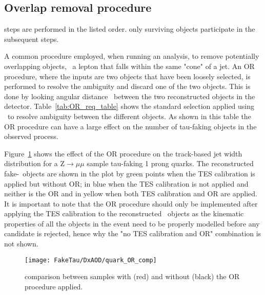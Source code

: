 	\subsection*{Overlap removal procedure}
	\label{sec:ORprocedure}
	\begin{table}[!hbt]
	\caption{steps are performed in the listed order. only surviving objects participate in the subsequent steps.}
	\begin{center}
	
	\end{center}
	\label{tab:OR_req_table}
	\end{table}
	A common procedure employed, when running an analysis, to remove potentially overlapping objects, \ie\ a lepton that falls within the same "cone" of a jet. An \ac{OR} procedure, where the inputs are two objects that have been loosely selected, is performed to resolve the ambiguity and discard one of the two objects. This is done by looking angular distance \dr\ between the two reconstructed objects in the detector.
	Table~\ref{tab:OR_req_table} shows the standard selection applied using \dr\ to resolve ambiguity between the different objects. 
	As shown in this table the \ac{OR} procedure can have a large effect on the number of tau-faking objects in the observed process.
	
	 Figure~\ref{fig:ORvsnoOR} shows the effect of the \ac{OR} procedure  on the track-based jet width distribution for a Z$\rightarrow\mu\mu$ sample tau-faking 1 prong quarks.
	 The reconstructed fake-\htau\ objects are shown in the plot by green points when the \ac{TES} calibration is applied but without \ac{OR}; in blue when the \ac{TES} calibration is not applied and neither is the \ac{OR} and in yellow when both \ac{TES} calibration and \ac{OR} are applied. 
	It is important to note that the \ac{OR} procedure should only be implemented after applying the \ac{TES} calibration to the reconstructed \htau\ objects as the kinematic properties of all the objects in the event need to be properly modelled before any candidate is rejected, hence why the "no \ac{TES} calibration and \ac{OR}" combination is not shown.	
	\begin{figure}[!hbt]
		\centering
				\texttt{[image: FakeTau/DxAOD/quark\_OR\_comp]}
		\caption{comparison between samples with (red) and without (black) the \ac{OR} procedure applied.}
	\label{fig:ORvsnoOR}
	\end{figure}	
	
